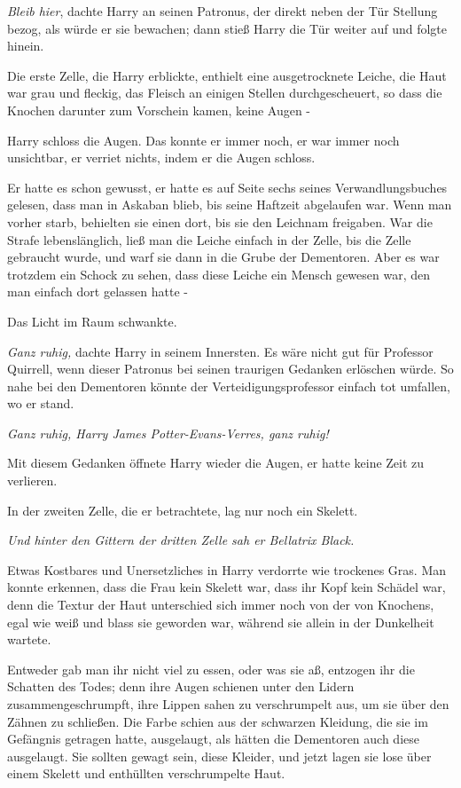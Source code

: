{\emph{Bleib hier}, dachte Harry an seinen Patronus, der direkt neben der Tür Stellung bezog, als würde er sie bewachen; dann stieß Harry die Tür weiter auf und folgte hinein.

Die erste Zelle, die Harry erblickte, enthielt eine ausgetrocknete Leiche, die Haut war grau und fleckig, das Fleisch an einigen Stellen durchgescheuert, so dass die Knochen darunter zum Vorschein kamen, keine Augen -

Harry schloss die Augen. Das konnte er immer noch, er war immer noch unsichtbar, er verriet nichts, indem er die Augen schloss.

Er hatte es schon gewusst, er hatte es auf Seite sechs seines Verwandlungsbuches gelesen, dass man in Askaban blieb, bis seine Haftzeit abgelaufen war. Wenn man vorher starb, behielten sie einen dort, bis sie den Leichnam freigaben. War die Strafe lebenslänglich, ließ man die Leiche einfach in der Zelle, bis die Zelle gebraucht wurde, und warf sie dann in die Grube der Dementoren. Aber es war trotzdem ein Schock zu sehen, dass diese Leiche ein Mensch gewesen war, den man einfach dort gelassen hatte -

Das Licht im Raum schwankte.

\emph{Ganz ruhig,} dachte Harry in seinem Innersten. Es wäre nicht gut für Professor Quirrell, wenn dieser Patronus bei seinen traurigen Gedanken erlöschen würde. So nahe bei den Dementoren könnte der Verteidigungsprofessor einfach tot umfallen, wo er stand.

\emph{Ganz ruhig, Harry James Potter-Evans-Verres, ganz ruhig!}

Mit diesem Gedanken öffnete Harry wieder die Augen, er hatte keine Zeit zu verlieren.

In der zweiten Zelle, die er betrachtete, lag nur noch ein Skelett.

\emph{Und hinter den Gittern der dritten Zelle sah er Bellatrix Black.}

Etwas Kostbares und Unersetzliches in Harry verdorrte wie trockenes Gras. Man konnte erkennen, dass die Frau kein Skelett war, dass ihr Kopf kein Schädel war, denn die Textur der Haut unterschied sich immer noch von der von Knochens, egal wie weiß und blass sie geworden war, während sie allein in der Dunkelheit wartete.

Entweder gab man ihr nicht viel zu essen, oder was sie aß, entzogen ihr die Schatten des Todes; denn ihre Augen schienen unter den Lidern zusammengeschrumpft, ihre Lippen sahen zu verschrumpelt aus, um sie über den Zähnen zu schließen. Die Farbe schien aus der schwarzen Kleidung, die sie im Gefängnis getragen hatte, ausgelaugt, als hätten die Dementoren auch diese ausgelaugt. Sie sollten gewagt sein, diese Kleider, und jetzt lagen sie lose über einem Skelett und enthüllten verschrumpelte Haut.

}
